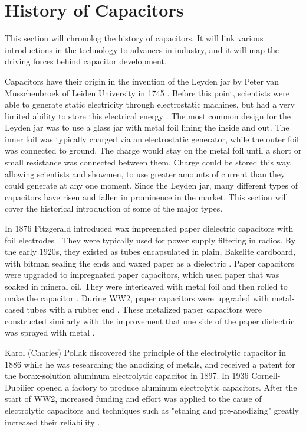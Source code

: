 \section {History of Capacitors}
\label{sec:history}

This section will chronolog the history of capacitors. It will link various introductions in the technology to advances in industry, and it will map the driving forces behind capacitor development.

Capacitors have their origin in the invention of the Leyden jar by Peter van Musschenbroek of Leiden University in 1745 \cite{empLight}. Before this point, scientists were able to generate static electricity through electrostatic machines, but had a very limited ability to store this electrical energy \cite{ieee_hist}.
The most common design for the Leyden jar was to use a glass jar with metal foil lining the inside and out. The inner foil was typically charged via an electrostatic generator, while the outer foil was connected to ground. The charge would stay on the metal foil until a short or small resistance was connected between them. Charge could be stored this way, allowing scientists and showmen, to use greater amounts of current than they could generate at any one moment.
Since the Leyden jar, many different types of capacitors have risen and fallen in prominence in the market. This section will cover the historical introduction of some of the major types.

In 1876 Fitzgerald introduced wax impregnated paper dielectric capacitors with foil electrodes \cite[ch.~11]{dumInv}\cite{learn_caps}. They were typically used for power supply filtering in radios. By the early 1920s, they existed as tubes encapsulated in plain, Bakelite cardboard, with bitman sealing the ends and waxed paper as a dielectric \cite[ch~3]{dumInv}.
Paper capacitors were upgraded to impregnated paper capacitors, which used paper that was soaked in mineral oil. They were interleaved with metal foil and then rolled to make the capacitor \cite[ch.~8.2.1.1]{poorIntro}. During WW2, paper capacitors were upgraded with metal-cased tubes with a rubber end \cite[ch.~8.1]{poorIntro}. These metalized paper capacitors were constructed similarly with the improvement that one side of the paper dielectric was sprayed with metal \cite{hist_cerFilt}.

Karol (Charles) Pollak discovered the principle of the electrolytic capacitor in 1886 while he was researching the anodizing of metals, and received a patent for the borax-solution aluminum electrolytic capacitor in 1897.  
In 1936 Cornell-Dubilier opened a factory to produce aluminum electrolytic capacitors. 
After the start of WW2, increased funding and effort was applied to the cause of electrolytic capacitors and techniques such as "etching and pre-anodizing" greatly increased their reliability \cite{deis_hist}\cite{wiki_elec}.

